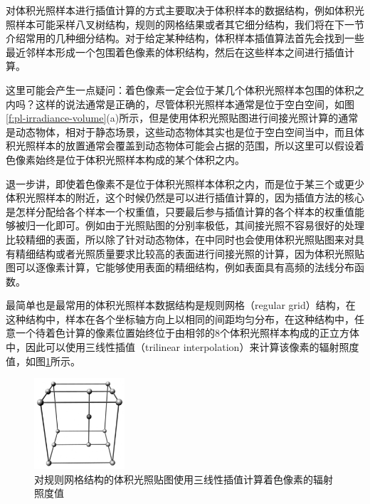 对体积光照样本进行插值计算的方式主要取决于体积样本的数据结构，例如体积光照样本可能采样八叉树结构，规则的网格结果或者其它细分结构，我们将在下一节介绍常用的几种细分结构。对于给定某种结构，体积样本插值算法首先会找到一些最近邻样本形成一个包围着色像素的体积结构，然后在这些样本之间进行插值计算。

\begin{myshaded}
	这里可能会产生一点疑问：着色像素一定会位于某几个体积光照样本包围的体积之内吗？这样的说法通常是正确的，尽管体积光照样本通常是位于空白空间，如图\ref{f:pl-irradiance-volume}(a)所示，但是使用体积光照贴图进行间接光照计算的通常是动态物体，相对于静态场景，这些动态物体其实也是位于空白空间当中，而且体积光照样本的放置通常会覆盖到动态物体可能会占据的范围，所以这里可以假设着色像素始终是位于体积光照样本构成的某个体积之内。
	
	退一步讲，即使着色像素不是位于体积光照样本体积之内，而是位于某三个或更少体积光照样本的附近，这个时候仍然是可以进行插值计算的，因为插值方法的核心是怎样分配给各个样本一个权重值，只要最后参与插值计算的各个样本的权重值能够被归一化即可。例如由于光照贴图的分别率极低，其间接光照不容易很好的处理比较精细的表面，所以除了针对动态物体，在\cite{a:PrecomputedLightinginCallofDuty}中同时也会使用体积光照贴图来对具有精细结构或者光照质量要求比较高的表面进行间接光照的计算，因为体积光照贴图可以逐像素计算，它能够使用表面的精细结构，例如表面具有高频的法线分布函数。
\end{myshaded}

最简单也是最常用的体积光照样本数据结构是规则网格（regular grid）结构，在这种结构中，样本在各个坐标轴方向上以相同的间距均匀分布，在这种结构中，任意一个待着色计算的像素位置始终位于由相邻的8个体积光照样本构成的正立方体中，因此可以使用三线性插值（trilinear interpolation）来计算该像素的辐射照度值，如图\ref{f:pl-trilinear-interpolation}所示。

\begin{figure}
	\sidecaption
	\includegraphics[width=0.3\textwidth]{figures/pl/trilinear-interpolation}
	\caption{对规则网格结构的体积光照贴图使用三线性插值计算着色像素的辐射照度值}
	\label{f:pl-trilinear-interpolation}
\end{figure}


